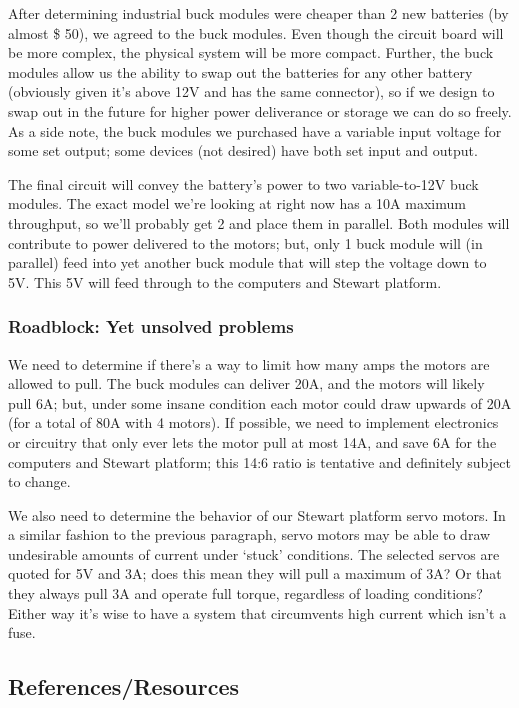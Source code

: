 \documentclass[a4paper, 10pt]{article}
\begin{document}
		After determining industrial buck modules were cheaper than 2 new batteries (by almost \$ 50), we agreed to the buck modules. Even though the circuit board will be more complex, the physical system will be more compact. Further, the buck modules allow us the ability to swap out the batteries for any other battery (obviously given it's above 12V and has the same connector), so if we design to swap out in the future for higher power deliverance or storage we can do so freely. As a side note, the buck modules we purchased have a variable input voltage for some set output; some devices (not desired) have both set input and output.
		
		The final circuit will convey the battery's power to two variable-to-12V buck modules. The exact model we're looking at right now has a 10A maximum throughput, so we'll probably get 2 and place them in parallel. Both modules will contribute to power delivered to the motors; but, only 1 buck module will (in parallel) feed into yet another buck module that will step the voltage down to 5V. This 5V will feed through to the computers and Stewart platform.
		
		\subsubsection{Roadblock: Yet \textbf{unsolved} problems}
		We need to determine if there's a way to limit how many amps the motors are allowed to pull. The buck modules can deliver 20A, and the motors will likely pull 6A; but, under some insane condition each motor could draw upwards of 20A (for a total of 80A with 4 motors). If possible, we need to implement electronics or circuitry that only ever lets the motor pull at most 14A, and save 6A for the computers and Stewart platform; this 14:6 ratio is tentative and definitely subject to change.
		
		We also need to determine the behavior of our Stewart platform servo motors. In a similar fashion to the previous paragraph, servo motors may be able to draw undesirable amounts of current under `stuck' conditions. The selected servos are quoted for 5V and 3A; does this mean they will pull a maximum of 3A? Or that they always pull 3A and operate full torque, regardless of loading conditions? Either way it's wise to have a system that circumvents high current which isn't a fuse.
		
	\subsection{References/Resources}
\end{document}

